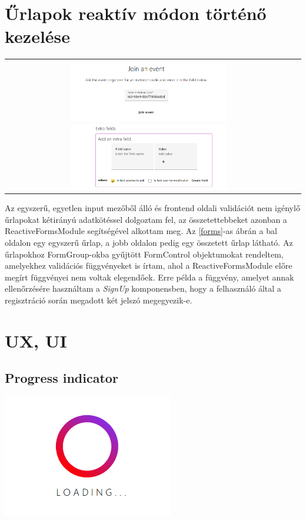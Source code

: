 \documentclass[a4paper,12pt]{report}
\theoremstyle{definition}
\theoremstyle{remark}
\begin{document}
\section{Űrlapok reaktív módon történő kezelése}

\begin{center}
\begin{tabular}{cc}
\includegraphics[width=70mm]{join_event}
\includegraphics[width=70mm]{extra_field_form}
\end{tabular}
\captionsetup{width=0.8\linewidth}
\label{forms}
\end{center}

Az egyszerű, egyetlen input mezőből álló és frontend oldali validációt nem igénylő űrlapokat kétirányú adatkötéssel dolgoztam fel, az összetettebbeket azonban a ReactiveFormsModule\cite{ReactiveFormswebsite} segítségével alkottam meg. Az \ref{forms}-as ábrán a bal oldalon egy egyszerű űrlap, a jobb oldalon pedig egy összetett űrlap látható.  Az űrlapokhoz FormGroup-okba gyűjtött FormControl objektumokat rendeltem, amelyekhez validációs függvényeket is írtam, ahol a ReactiveFormsModule előre megírt függvényei nem voltak elegendőek. Erre példa a függvény, amelyet annak ellenőrzésére használtam a  \textit{SignUp} komponensben, hogy a felhasználó által a regisztráció során megadott két jelszó megegyezik-e.

\section{UX, UI}

	\subsection{Progress indicator}

\begin{center}
\includegraphics[width=75mm]{progress_indicator}
\captionsetup{width=0.8\linewidth}
\label{progress}
\end{center}
\end{document}

